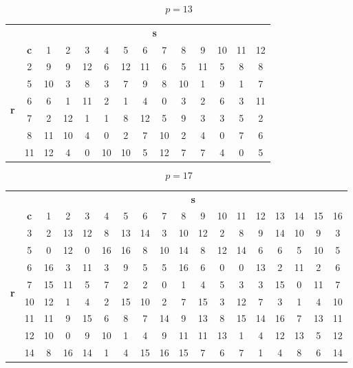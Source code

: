 \documentclass{article}
\begin{document}
\begin{center}
\[p = 13\]
\begin{tabular}{cc|c|c|c|c|c|c|c|c|c|c|c|c|}
&                               & \multicolumn{12}{c|}{\textbf{s}} \\
& \textbf{c}                    & 1& 2& 3& 4& 5& 6& 7& 8& 9&10&11&12 \\ \hline
\multirow{6}{*}{\textbf{r}} & 2 & 9& 9&12& 6&12&11& 6& 5&11& 5& 8& 8 \\ \cline{2-14}
							& 5 &10& 3& 8& 3& 7& 9& 8&10& 1& 9& 1& 7 \\ \cline{2-14}
							& 6 & 6& 1&11& 2& 1& 4& 0& 3& 2& 6& 3&11 \\ \cline{2-14}
							& 7 & 2&12& 1& 1& 8&12& 5& 9& 3& 3& 5& 2 \\ \cline{2-14}
							& 8 &11&10& 4& 0& 2& 7&10& 2& 4& 0& 7& 6 \\ \cline{2-14}
							&11 &12& 4& 0&10&10& 5&12& 7& 7& 4& 0& 5 \\ \hline
\end{tabular}
\newpage

\[p = 17\]
\begin{tabular}{cc|c|c|c|c|c|c|c|c|c|c|c|c|c|c|c|c|}
	&                               & \multicolumn{16}{c|}{\textbf{s}} \\
	& \textbf{c}                    & 1& 2& 3& 4& 5& 6& 7& 8& 9&10&11&12&13&14&15&16 \\ \hline
	\multirow{8}{*}{\textbf{r}} & 3 & 2&13&12& 8&13&14& 3&10&12& 2& 8& 9&14&10& 9& 3 \\ \cline{2-18}
								& 5 & 0&12& 0&16&16& 8&10&14& 8&12&14& 6& 6& 5&10& 5 \\ \cline{2-18}
								& 6 &16& 3&11& 3& 9& 5& 5&16& 6& 0& 0&13& 2&11& 2& 6 \\ \cline{2-18}
								& 7 &15&11& 5& 7& 2& 2& 0& 1& 4& 5& 3& 3&15& 0&11& 7 \\ \cline{2-18}
								&10 &12& 1& 4& 2&15&10& 2& 7&15& 3&12& 7& 3& 1& 4&10 \\ \cline{2-18}
								&11 &11& 9&15& 6& 8& 7&14& 9&13& 8&15&14&16& 7&13&11 \\ \cline{2-18}
								&12 &10& 0& 9&10& 1& 4& 9&11&11&13& 1& 4&12&13& 5&12 \\ \cline{2-18}
								&14 & 8&16&14& 1& 4&15&16&15& 7& 6& 7& 1& 4& 8& 6&14 \\ \hline
\end{tabular}
\bigskip
	
\end{center}
\end{document}
